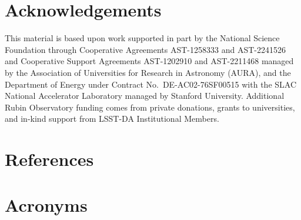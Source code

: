 \documentclass[OPS,lsstdraft,authoryear,toc]{lsstdoc}
\begin{document}
\section{Acknowledgements}

This material is based upon work supported in part by the National Science Foundation through Cooperative Agreements AST-1258333 and AST-2241526 and Cooperative Support Agreements AST-1202910 and AST-2211468 managed by the Association of Universities for Research in Astronomy (AURA), and the Department of Energy under Contract No.\ DE-AC02-76SF00515 with the SLAC National Accelerator Laboratory managed by Stanford University.
Additional Rubin Observatory funding comes from private donations, grants to universities, and in-kind support from LSST-DA Institutional Members.

\section{References} \label{sec:bib}
\renewcommand{\refname}{} %


\section{Acronyms} \label{sec:acronyms}

\end{document}
